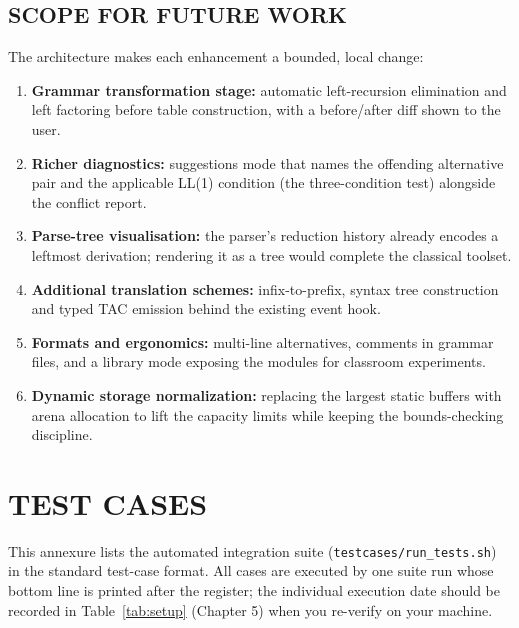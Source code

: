 \documentclass[12pt,a4paper,oneside,openany]{report}
\newcommand{\code}[1]{\texttt{#1}}
\begin{document}
\section{SCOPE FOR FUTURE WORK}
The architecture makes each enhancement a bounded, local change:
\begin{enumerate}
  \item \textbf{Grammar transformation stage:} automatic left-recursion
        elimination and left factoring before table construction, with a
        before/after diff shown to the user.
  \item \textbf{Richer diagnostics:} suggestions mode that names the
        offending alternative pair and the applicable LL(1) condition
        (the three-condition test) alongside the conflict report.
  \item \textbf{Parse-tree visualisation:} the parser's reduction history
        already encodes a leftmost derivation; rendering it as a tree
        would complete the classical toolset.
  \item \textbf{Additional translation schemes:} infix-to-prefix, syntax
        tree construction and typed TAC emission behind the existing
        event hook.
  \item \textbf{Formats and ergonomics:} multi-line alternatives,
        comments in grammar files, and a library mode exposing the
        modules for classroom experiments.
  \item \textbf{Dynamic storage normalization:} replacing the largest
        static buffers with arena allocation to lift the capacity limits
        while keeping the bounds-checking discipline.
\end{enumerate}




\appendix

\renewcommand{\chaptertitlename}{ANNEXURE}

\chapter{TEST CASES}
\label{annex:testcases}

This annexure lists the automated integration suite
(\code{testcases/run\_tests.sh}) in the standard test-case format. All
cases are executed by one suite run whose bottom line is printed after
the register; the individual execution date should be recorded in
Table~\ref{tab:setup} (Chapter 5) when you re-verify on your machine.
\end{document}
